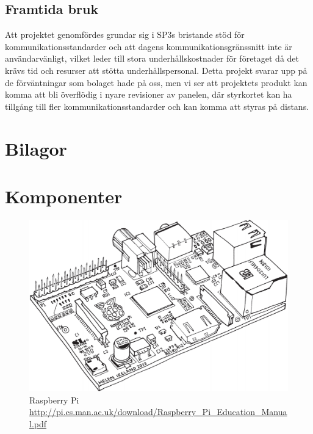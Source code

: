 \documentclass{article}
\begin{document}
        \subsection{Framtida bruk} %
        \label{sub:framtida_bruk}
            Att projektet genomfördes grundar sig i SP3s bristande stöd för kommunikationsstandarder och att dagens kommunikationsgränssnitt inte är användarvänligt, vilket leder till stora underhållskostnader för företaget då det krävs tid och resurser att stötta underhålls\-personal. Detta projekt svarar upp på de förväntningar som bolaget hade på oss, men vi ser att projektets produkt kan komma att bli överflödig i nyare revisioner av panelen, där styrkortet kan ha tillgång till fler kommunikationsstandarder och kan komma att styras på distans.

    \newpage

    \clearpage
    \printbibliography      
    \newpage
    \section{Bilagor} %
    \label{sec:appendix}
    \appendix
        \section{Komponenter} %
        \label{sec:komp}
                \begin{figure}[h!]
                  \centering
                    \includegraphics[scale=0.4]{img/rpi}
                  \caption[Raspberry Pi]{Raspberry Pi \\ \url{http://pi.cs.man.ac.uk/download/Raspberry_Pi_Education_Manual.pdf}}
                  \label{fig:raspberry}
                \end{figure}
\end{document}

